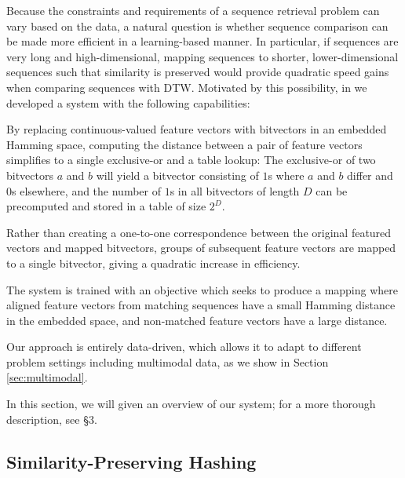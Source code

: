 \documentclass{article} %
\begin{document}
Because the constraints and requirements of a sequence retrieval problem can vary based on the data, a natural question is whether sequence comparison can be made more efficient in a learning-based manner.
In particular, if sequences are very long and high-dimensional, mapping sequences to shorter, lower-dimensional sequences such that similarity is preserved would provide quadratic speed gains when comparing sequences with DTW.
Motivated by this possibility, in \cite{raffel2015large} we developed a system with the following capabilities:
\begin{description}[topsep=1pt,itemsep=-1pt,leftmargin=10pt]
\item[Maps to a Hamming space:] By replacing continuous-valued feature vectors with bitvectors in an embedded Hamming space, computing the distance between a pair of feature vectors simplifies to a single exclusive-or and a table lookup: The exclusive-or of two bitvectors $a$ and $b$ will yield a bitvector consisting of $1$s where $a$ and $b$ differ and $0$s elsewhere, and the number of $1$s in all bitvectors of length $D$ can be precomputed and stored in a table of size $2^D$.
\item[Downsamples sequences:] Rather than creating a one-to-one correspondence between the original featured vectors and mapped bitvectors, groups of subsequent feature vectors are mapped to a single bitvector, giving a quadratic increase in efficiency.
\item[Preserves similarity:] The system is trained with an objective which seeks to produce a mapping where aligned feature vectors from matching sequences have a small Hamming distance in the embedded space, and non-matched feature vectors have a large distance.
\item[Learns its representation:] Our approach is entirely data-driven, which allows it to adapt to different problem settings including multimodal data, as we show in Section \ref{sec:multimodal}.
\end{description}

In this section, we will given an overview of our system; for a more thorough description, see \cite{raffel2015large} \S3.

\subsection{Similarity-Preserving Hashing}
\end{document}
